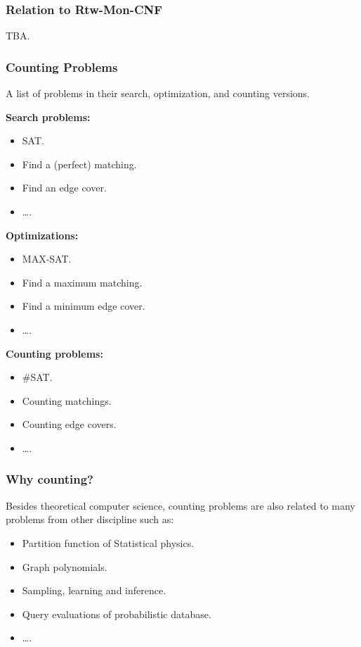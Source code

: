 \documentclass[mathserif]{beamer}
\begin{document}
\begin{frame}
	\frametitle{ Relation to Rtw-Mon-CNF}
	TBA.
\end{frame}

\begin{frame}
	\frametitle{Counting Problems}
	A list of problems in their search, optimization, and counting versions.

	\begin{minipage}[tb]{0.3\linewidth}
		{\bf Search problems:}
		\begin{itemize}
			\item SAT.
				\pause
			\item Find a (perfect) matching.
				\pause
			\item Find an edge cover.
			\item \dots.
		\end{itemize}
	\end{minipage}
	\pause
	\begin{minipage}[tb]{0.3\linewidth}
		{\bf Optimizations:}
		\begin{itemize}
			\item MAX-SAT.
				\pause
			\item Find a maximum matching.
				\pause
			\item Find a minimum edge cover.
			\item \dots.
		\end{itemize}
	\end{minipage}
	\pause
	\begin{minipage}[tb]{0.3\linewidth}
		{\bf Counting problems:}
		\begin{itemize}
			\item \#SAT.
				\pause
			\item Counting matchings.
				\pause
			\item Counting edge covers.
			\item \dots.
		\end{itemize}
	\end{minipage}
\end{frame}

\begin{frame}
	\frametitle{Why counting?}
Besides theoretical computer science, counting problems are also related to many problems from other discipline such as:
\begin{itemize}
	\item Partition function of Statistical physics. 
		\pause
	\item Graph polynomials. 
		\pause
	\item Sampling, learning and inference. 
		\pause
	\item Query evaluations of probabilistic database.
	\item \dots.
\end{itemize}
\end{frame}
\end{document}
